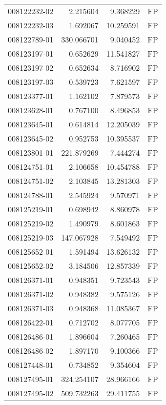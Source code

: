 \begin{tabular}{lrrl}
008122232-02 &    2.215604 &       9.368229 &   FP \\
008122232-03 &    1.692067 &      10.259591 &   FP \\
008122789-01 &  330.066701 &       9.040452 &   FP \\
008123197-01 &    0.652629 &      11.541827 &   FP \\
008123197-02 &    0.652634 &       8.716902 &   FP \\
008123197-03 &    0.539723 &       7.621597 &   FP \\
008123377-01 &    1.162102 &       7.879573 &   FP \\
008123628-01 &    0.767100 &       8.496853 &   FP \\
008123645-01 &    0.614814 &      12.205039 &   FP \\
008123645-02 &    0.952753 &      10.395537 &   FP \\
008123801-01 &  221.879269 &       7.444274 &   FP \\
008124751-01 &    2.106658 &      10.454788 &   FP \\
008124751-02 &    2.103845 &      13.281303 &   FP \\
008124788-01 &    2.545924 &       9.570971 &   FP \\
008125219-01 &    0.698942 &       8.860978 &   FP \\
008125219-02 &    1.490979 &       8.601863 &   FP \\
008125219-03 &  147.067928 &       7.549492 &   FP \\
008125652-01 &    1.591494 &      13.626132 &   FP \\
008125652-02 &    3.184506 &      12.857339 &   FP \\
008126371-01 &    0.948351 &       9.723543 &   FP \\
008126371-02 &    0.948382 &       9.575126 &   FP \\
008126371-03 &    0.948368 &      11.085367 &   FP \\
008126422-01 &    0.712702 &       8.077705 &   FP \\
008126486-01 &    1.896604 &       7.260465 &   FP \\
008126486-02 &    1.897170 &       9.100366 &   FP \\
008127448-01 &    0.734852 &       9.354604 &   FP \\
008127495-01 &  324.254107 &      28.966166 &   FP \\
008127495-02 &  509.732263 &      29.411755 &   FP \\

\end{tabular}
